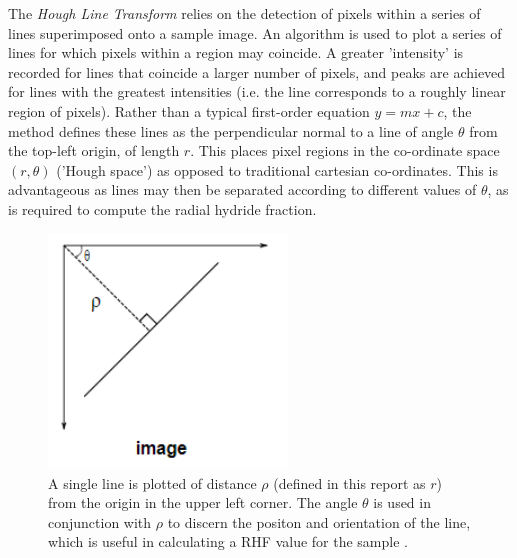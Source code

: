 \documentclass{article}
\begin{document}
	The \textit{Hough Line Transform} relies on the detection of pixels within a series of lines superimposed onto a sample image. An algorithm is used to plot a series of lines for which pixels within a region may coincide. A greater 'intensity' is recorded for lines that coincide a larger number of pixels, and peaks are achieved for lines with the greatest intensities (i.e. the line corresponds to a roughly linear region of pixels). Rather than a typical first-order equation $y=mx+c$, the method defines these lines as the perpendicular normal to a line of angle $\theta$ from the top-left origin, of length $r$. This places pixel regions in the co-ordinate space $(r,\theta)$ ('Hough space') as opposed to traditional cartesian co-ordinates. This is advantageous as lines may then be separated according to different values of $\theta$, as is required to compute the radial hydride fraction.
	\\
	\begin{figure}[H]
		\centering
		\includegraphics[width=2.5in]{Figures/houghtransform.PNG} 
		\caption{A single line is plotted of distance $\rho$ (defined in this report as $r$) from the origin in the upper left corner. The angle $\theta$ is used in conjunction with $\rho$ to discern the positon and orientation of the line, which is useful in calculating a RHF value for the sample \cite{OpenCV2013}.}
		\label{MedialAxis}
	\end{figure}
\end{document}
